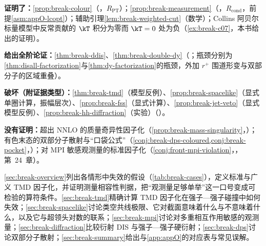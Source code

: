 \begin{tcolorbox}[enhanced,breakable,title=本章证明了什么／没有证明什么,fonttitle=\bfseries,
  colback=gray!3!white,colframe=gray!55!black,boxrule=0.6pt,arc=2pt,
  left=5pt,right=5pt,top=3pt,bottom=3pt,before skip=6pt,after skip=6pt]
\textbf{证明了：}\cref{prop:break-colour}（\tagR，$R_{\mathrm{PT}}$）；\cref{prop:break-measurement}（\tagR，$R_{\mathrm{cond}}$，前提\cref{asm:appO-lcopt}）；辅助引理\cref{lem:break-weighted-cut}（数学）；Collins 阿贝尔标量模型中反常贡献的 $\kT$ 积分为零而 $\kT=0$ 处为负（\cref{ex:break-c07}，本书给出的证明）。\par
\textbf{给出全阶论证：}\cref{thm:break-ddis}、\cref{thm:break-double-dy}（\tagA；瓶颈分别为\cref{thm:disall-factorization}与\cref{thm:dy-factorization}的瓶颈，外加 $r^+$ 围道形变与双部分子的区域重叠）。\par
\textbf{破坏（附证据类型）：}\cref{thm:break-tmd}（模型反例）、\cref{prop:break-spacelike}（显式单圈计算，振幅层次）、\cref{prop:break-fss}（显式计算）、\cref{prop:break-jet-veto}（显式模型反例）、\cref{prop:break-hh-diffraction}（实验）（\tagV）。\par
\textbf{没有证明：}超出 NNLO 的质量奇异性因子化（\cref{prop:break-mass-singularity}，\tagC）；有色末态的双部分子散射与“口袋公式”（\cref{conj:break-dps-coloured,conj:break-pocket}，\tagC）；对 MPI 敏感观测量的标准因子化（\cref{conj:front-mpi-violation}，\tagC，第~24~章）。
\end{tcolorbox}

\cref{sec:break-overview}列出各情形中失效的假设（\cref{tab:break-cases}），定义标准与广义 TMD 因子化，并证明测量相容性判据，把“观测量足够单举”这一口号变成可检验的算符条件。\cref{sec:break-tmd}精确计算 TMD 因子化在强子—强子碰撞中如何失效；\cref{sec:break-spacelike}讨论类空共线极限、它对截面意味着什么与不意味着什么，以及它与超领头对数的联系；\cref{sec:break-mpi}讨论对多重相互作用敏感的观测量；\cref{sec:break-diffraction}比较衍射 DIS 与强子—强子硬衍射；\cref{sec:break-dps}讨论双部分子散射；\cref{sec:break-summary}给出与\cref{app:appO}的对应表与常见误解。
